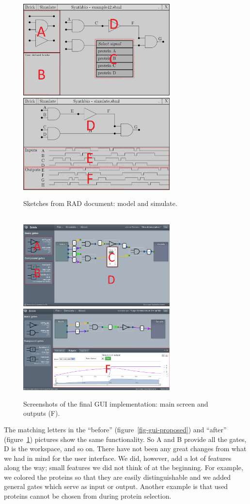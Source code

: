 \documentclass[a4paper]{article}
\begin{document}
\begin{figure}[h!]
\includegraphics[width=8cm]{pictures/gui_sketch1_marks.png} 
\includegraphics[width=8cm]{pictures/gui_sketch2_marks.png}
\caption{Sketches from RAD document: model and simulate.}
\label{fig-gui-proposed}
\qquad \\
\includegraphics[width=8cm]{pictures/gui_final1_marks.png} 
\includegraphics[width=8cm]{pictures/gui_final2_marks.png}
\caption{Screenshots of the final GUI implementation: main screen and outputs (F).}
\label{fig-gui-implemented}
\end{figure}

The matching letters in the ``before'' (figure~\ref{fig-gui-proposed}) and ``after'' (figure~\ref{fig-gui-implemented}) pictures show the same functionality. So A and B provide all the gates, D is the workspace, and so on. There have not been any great changes from what we had in mind for the user interface. We did, however, add a lot of features along the way; small features we did not think of at the beginning. For example, we colored the proteins so that they are easily distinguishable and we added general gates which serve as input or output. Another example is that used proteins cannot be chosen from during protein selection.
\end{document}
